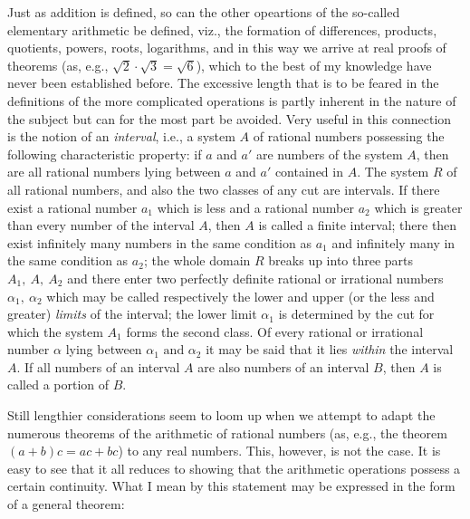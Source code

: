 \documentclass[oneside,12pt]{book}
\newcommand{\iit}[1]{\textit{#1}}
\begin{document}
Just as addition is defined, so can the other opeartions of the so-called elementary arithmetic be defined, viz., the formation of differences, products, quotients, powers, roots, logarithms, and in this way we arrive at real proofs of theorems (as, e.g., $\sqrt{2}\cdot\sqrt{3}=\sqrt{6}$), which to the best of my knowledge have never been established before. The excessive length that is to be feared in the definitions of the more complicated operations is partly inherent in the nature of the subject but can for the most part be avoided. Very useful in this connection is the notion of an \iit{interval}, i.e., a system $A$ of rational numbers possessing the following characteristic property: if $a$ and $a'$ are numbers of the system $A$, then are all rational numbers lying between $a$ and $a'$ contained in $A$. The system $R$ of all rational numbers, and also the two classes of any cut are intervals. If there exist a rational number $a_1$ which is less and a rational number $a_2$ which is greater than every number of the interval $A$, then $A$ is called a finite interval; there then exist infinitely many numbers in the same condition as $a_1$ and infinitely many in the same condition as $a_2$; the whole domain $R$ breaks up into three parts $A_1,\ A,\ A_2$ and there enter two perfectly definite rational or irrational numbers $\alpha_1,\ \alpha_2$ which may be called respectively the lower and upper (or the less and greater) \iit{limits} of the interval; the lower limit $\alpha_1$ is determined by the cut for which the system $A_1$ forms the second class. Of every rational or irrational number $\alpha$ lying between $\alpha_1 \text{ and } \alpha_2$ it may be said that it lies \iit{within} the interval $A$. If all numbers of an interval $A$ are also numbers of an interval $B$, then $A$ is called a portion of $B$. \par 

Still lengthier considerations seem to loom up when we attempt to adapt the numerous theorems of the arithmetic of rational numbers (as, e.g., the theorem $(a+b)c=ac+bc$) to any real numbers. This, however, is not the case. It is easy to see that it all reduces to showing that the arithmetic operations possess a certain continuity. What I mean by this statement may be expressed in the form of a general theorem: \par 
\end{document}
